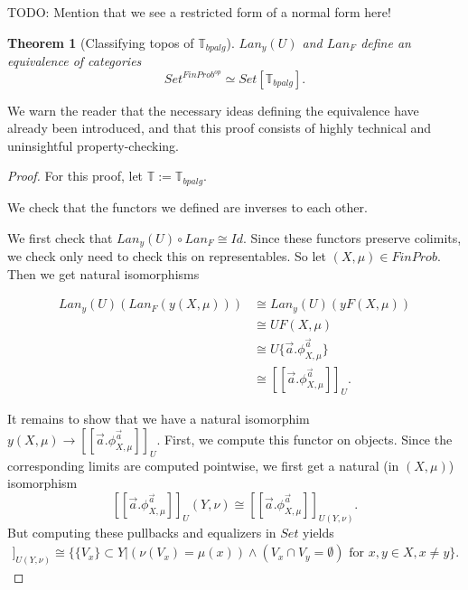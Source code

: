 \documentclass[a4paper]{amsproc}
\theoremstyle{plain}
\newtheorem{theorem}{Theorem}[section]
\theoremstyle{definition}
\theoremstyle{remark}
\numberwithin{equation}{section}
\newcommand{\ldoub}{[\![ }
\newcommand{\rdoub}{]\!]}
\begin{document}
TODO: Mention that we see a restricted form of a normal form here!

\begin{theorem}[Classifying topos of $\mathbb{T}_{bpalg}$] \label{classifying_presheaf}
$Lan_y(U)$ and $Lan_F$ define an equivalence of categories
\[
Set^{FinProb^{op}} \simeq Set[\mathbb{T}_{bpalg}].
\]
\end{theorem}

We warn the reader that the necessary ideas defining the equivalence have already been introduced, and that this proof consists of highly technical and uninsightful property-checking.

\begin{proof}
For this proof, let $\mathbb{T} := \mathbb{T}_{bpalg}$.

We check that the functors we defined are inverses to each other.

We first check that $Lan_y(U) \circ Lan_F \cong Id$. Since these functors preserve colimits, we check only need to check this on representables. So let $(X,\mu) \in FinProb$. Then we get natural isomorphisms

\begin{align*}
Lan_y(U)(Lan_F(y(X,\mu))) &\cong Lan_y(U)(yF(X,\mu)) \\
&\cong UF(X,\mu) \\
&\cong U \{\vec{a} . \phi^{\vec{a}}_{X,\mu}\} \\
&\cong \ldoub \vec{a} . \phi^{\vec{a}}_{X,\mu} \rdoub_U .
\end{align*}

It remains to show that we have a natural isomorphim $y (X,\mu) \to \ldoub \vec{a} . \phi^{\vec{a}}_{X,\mu} \rdoub_U$. First, we compute this functor on objects. Since the corresponding limits are computed pointwise, we first get a natural (in $(X,\mu)$) isomorphism
\[
\ldoub \vec{a} . \phi^{\vec{a}}_{X,\mu} \rdoub_U (Y,\nu) \cong \ldoub \vec{a} . \phi^{\vec{a}}_{X,\mu} \rdoub_{U(Y,\nu)} .
\]
But computing these pullbacks and equalizers in $Set$ yields
\begin{align*}
\ldoub \vec{a} . \phi^{\vec{a}}_{X,\mu} \rdoub_{U(Y,\nu)} \cong
\{\{V_x\} \subset Y | (\nu(V_x) = \mu(x)) \wedge (V_x \cap V_y = \emptyset) \text{ for } x,y \in X, x \neq y\} .
\end{align*}


\end{proof}
\end{document}

